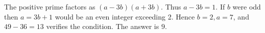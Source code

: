 The positive prime factors as $(a-3b)(a+3b)$. Thus $a-3b=1$. If $b$ were odd then $a=3b+1$ would be an even integer exceeding 2. Hence $b=2,a=7$, and $49-36=13$ verifies the condition. The answer is $\boxed9$.
